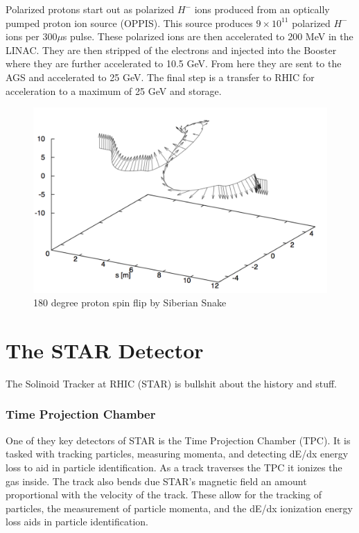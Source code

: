 \documentclass[abstract = on,listof=totoc, bibliography=totoc]{scrreprt}
\begin{document}
Polarized protons start out as polarized $H^-$ ions produced from an optically pumped proton ion source (OPPIS).  This source produces $9\times 10^{11}$ polarized $H^-$ ions per 300$\mu$s pulse. These polarized ions are then accelerated to 200 MeV in the LINAC. They are then stripped of the electrons and injected into the Booster where they are further accelerated to 10.5 GeV. From here they are sent to the AGS and accelerated to 25 GeV. The final step is a transfer to RHIC for acceleration to a maximum of 25 GeV and storage.   \cite{ppCollider}
\begin{figure}
\begin{center}
\includegraphics[width = 1\textwidth]{spinFlipFromPaper}
\caption[Spin flip by Siberian Snake]{180 degree proton spin flip by Siberian Snake}
\label{fig:spinFlip}
\end{center}
\end{figure}



\FloatBarrier

\section{The STAR Detector}
The Solinoid Tracker at RHIC (STAR) is bullshit about the history and stuff.

\subsubsection[TPC]{Time Projection Chamber}
One of they key detectors of STAR is the Time Projection Chamber (TPC). It is tasked with tracking particles, measuring momenta, and detecting dE/dx energy loss to aid in particle identification. As a track traverses the TPC it ionizes the gas inside. The track also bends due STAR's magnetic field an amount proportional with the velocity of the track. These allow for the tracking of particles, the measurement of particle momenta, and the dE/dx ionization energy loss aids in particle identification. 
\end{document}
